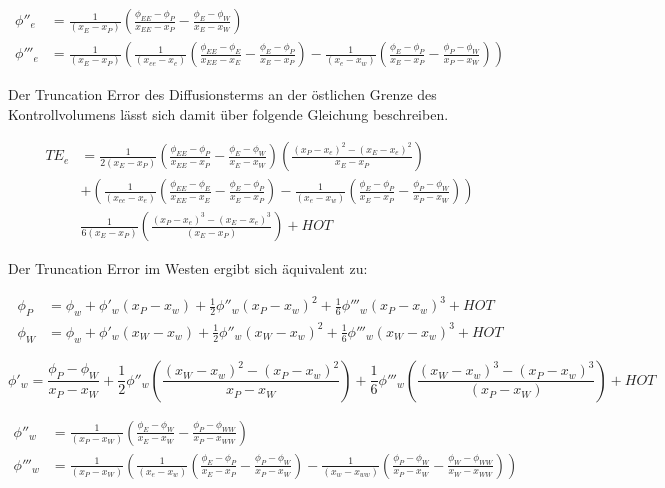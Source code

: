 \documentclass[11pt, ngerman,colorback,accentcolor=tud2d]{tudreport}
\begin{document}
\begin{align*}
  \phi''_e &= \frac{1}{(x_E-x_P)}\left({
\frac{\phi_{EE}-\phi_P}{x_{EE}-x_P}-\frac{\phi_E-\phi_W}{x_E-x_W}}\right)\\
\phi'''_e &= \frac{1}{(x_E-x_P)}\left({
\frac{1}{(x_{ee}-x_e)}
\left({\frac{\phi_{EE}-\phi_E}{x_{EE}-x_E}-\frac{\phi_E-\phi_P}{x_E-x_P} }\right)
-\frac{1}{(x_e-x_w)}
\left({\frac{\phi_E-\phi_P}{x_E-x_P} - \frac{\phi_P-\phi_W}{x_P-x_W}  }\right)
}\right)
\end{align*}


Der Truncation Error des Diffusionsterms an der östlichen Grenze des Kontrollvolumens
lässt sich damit über folgende Gleichung beschreiben.

\begin{align*}
  {TE}_e &= \frac{1}{2 (x_E-x_P)}\left({
\frac{\phi_{EE}-\phi_P}{x_{EE}-x_P}-\frac{\phi_E-\phi_W}{x_E-x_W}}\right) \left({\frac{{(x_P-x_e)}^2-{(x_E-x_e)}^2}{x_E-x_P}}\right)\\
&+
\left({
\frac{1}{(x_{ee}-x_e)}
\left({\frac{\phi_{EE}-\phi_E}{x_{EE}-x_E}-\frac{\phi_E-\phi_P}{x_E-x_P} }\right)
-\frac{1}{(x_e-x_w)}
\left({\frac{\phi_E-\phi_P}{x_E-x_P} - \frac{\phi_P-\phi_W}{x_P-x_W}  }\right)
}\right)\\
&\frac{1}{6(x_E-x_P)}\left({\frac{{(x_P-x_e)}^3-{(x_E-x_e)}^3}{(x_E-x_P)}}\right)
+HOT
\end{align*}

Der Truncation Error im Westen ergibt sich äquivalent zu:

\begin{align*}
  \phi_P &= \phi_w + \phi'_w(x_P-x_w)+\frac{1}{2}\phi''_w(x_P-x_w)^2
  +\frac{1}{6}\phi'''_w(x_P-x_w)^3+HOT\\
  \phi_W &= \phi_w + \phi'_w(x_W-x_w)+\frac{1}{2}\phi''_w(x_W-x_w)^2
  +\frac{1}{6}\phi'''_w(x_W-x_w)^3+HOT
\end{align*}

\begin{equation}
  \phi'_w = \frac{\phi_P-\phi_W}{x_P-x_W}+\frac{1}{2}\phi''_w
\left({\frac{{(x_W-x_w)}^2-{(x_P-x_w)}^2}{x_P-x_W}}\right)+
\frac{1}{6} \phi'''_w \left({\frac{{(x_W-x_w)}^3-{(x_P-x_w)}^3}{(x_P-x_W)}}\right)+HOT
\end{equation}

\begin{align*}
  \phi''_w &= \frac{1}{(x_P-x_W)}\left({
\frac{\phi_{E}-\phi_W}{x_{E}-x_W}-\frac{\phi_P-\phi_{WW}}{x_P-x_{WW}}}\right)\\
 \phi'''_w &= \frac{1}{(x_P-x_W)}\left({
\frac{1}{(x_e-x_w)}
\left({\frac{\phi_E-\phi_P}{x_E-x_P}-\frac{\phi_P-\phi_W}{x_P-x_W} }\right)
-\frac{1}{(x_w-x_{ww})}
\left({\frac{\phi_P-\phi_W}{x_P-x_W} - \frac{\phi_W-\phi_{WW}}{x_W-x_{WW}}  }\right)
}\right)
\end{align*}
\end{document}
